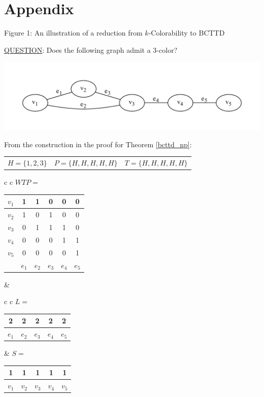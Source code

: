 \documentclass[]{article}
\theoremstyle{definition}
\theoremstyle{remark}
\numberwithin{equation}{section}
\begin{document}
\section{Appendix}
\begin{center}
	Figure 1: An illustration of a reduction from $k$-Colorability to BCTTD
\end{center}
\setcounter{figure}{1}
\underline{QUESTION}: Does the following graph admit a 3-color?
\begin{center}
	\includegraphics[scale=0.75]{3colorinstance}
\end{center}
From the construction in the proof for Theorem \ref{bcttd_np}: \\
\begin{center}
	\begin{tabular}{ l c r }
		$H=\{1,2,3\}$ & $P=\{H,H,H,H,H\}$ & $T=\{H,H,H,H,H\}$
	\end{tabular}
	\begin{tabular}{ c c }
		$WTP=$ \begin{tabular}{ r | c | c | c | c | c }
			$v_1$ & 1 & 1 & 0 & 0 & 0 \\ \hline
			$v_2$ & 1 & 0 & 1 & 0 & 0 \\ \hline
			$v_3$ & 0 & 1 & 1 & 1 & 0 \\ \hline
			$v_4$ & 0 & 0 & 0 & 1 & 1 \\ \hline
			$v_5$ & 0 & 0 & 0 & 0 & 1 \\ \hline
			& $e_1$ & $e_2$ & $e_3$ & $e_4$ & $e_5$
		\end{tabular} & 
		\begin{tabular}{ c c }
			$L=$ \begin{tabular}{ c | c | c | c | c }
				2 & 2 & 2 & 2 & 2 \\ \hline
				$e_1$ & $e_2$ & $e_3$ & $e_4$ & $e_5$
			\end{tabular} & $S=$ \begin{tabular}{ c | c | c | c | c }
			1 & 1 & 1 & 1 & 1 \\ \hline
			$v_1$ & $v_2$ & $v_3$ & $v_4$ & $v_5$
		\end{tabular}
	\end{tabular} 
\end{tabular}
\end{center}
\end{document}
